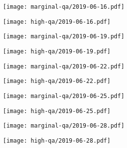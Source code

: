 \documentclass{article}
\begin{document}
\begin{figure}[H]
	\ContinuedFloat
	\centering
	\begin{subfigure}{0.48\linewidth}
		\texttt{[image: marginal-qa/2019-06-16.pdf]}
	\end{subfigure}
	\begin{subfigure}{0.48\linewidth}
		\texttt{[image: high-qa/2019-06-16.pdf]}
	\end{subfigure}
	\begin{subfigure}{0.48\linewidth}
		\texttt{[image: marginal-qa/2019-06-19.pdf]}
	\end{subfigure}
	\begin{subfigure}{0.48\linewidth}
		\texttt{[image: high-qa/2019-06-19.pdf]}
	\end{subfigure}
	\begin{subfigure}{0.48\linewidth}
		\texttt{[image: marginal-qa/2019-06-22.pdf]}
	\end{subfigure}
	\begin{subfigure}{0.48\linewidth}
		\texttt{[image: high-qa/2019-06-22.pdf]}
	\end{subfigure}
	\begin{subfigure}{0.48\linewidth}
		\texttt{[image: marginal-qa/2019-06-25.pdf]}
	\end{subfigure}
	\begin{subfigure}{0.48\linewidth}
		\texttt{[image: high-qa/2019-06-25.pdf]}
	\end{subfigure}
	\begin{subfigure}{0.48\linewidth}
		\texttt{[image: marginal-qa/2019-06-28.pdf]}
	\end{subfigure}
	\begin{subfigure}{0.48\linewidth}
		\texttt{[image: high-qa/2019-06-28.pdf]}
	\end{subfigure}
\end{figure}
\end{document}
